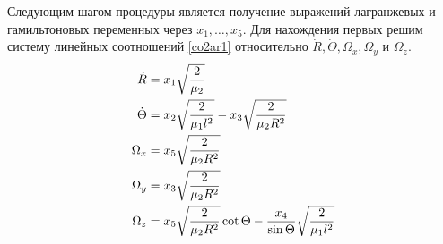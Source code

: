 \documentclass[12pt]{article}
\newcommand{\dR}{\dot{R}}
\newcommand{\dT}{\dot{\Theta}}
\begin{document}
Следующим шагом процедуры является получение выражений лагранжевых и гамильтоновых переменных через $x_1, \dots, x_5$. Для нахождения первых решим систему линейных соотношений \eqref{co2ar1} относительно $\dR, \dT, \Omega_x, \Omega_y$ и $\Omega_z$.   
\begin{gather}
	\begin{aligned}
			\dR &= x_1 \sqrt{\frac{2}{\mu_2}} \\
			\dT &= x_2 \sqrt{\frac{2}{\mu_1 l^2}} - x_3 \sqrt{\frac{2}{\mu_2 R^2}} \\
			\Omega_x &= x_5 \sqrt{\frac{2}{\mu_2 R^2}} \\
			\Omega_y &= x_3 \sqrt{\frac{2}{\mu_2 R^2}} \\
			\Omega_z &= x_5 \sqrt{\frac{2}{\mu_2 R^2}} \cot{\Theta} - \frac{x_4}{\sin \Theta} \sqrt{\frac{2}{\mu_1 l^2}} 
	\end{aligned} \notag
\end{gather}
\end{document}
